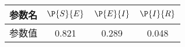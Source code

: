 \begin{tabular}{cccc}
\hline
参数名&$\P{S}{E}$&$\P{E}{I}$&$\P{I}{R}$\\
\hline
参数值&0.821&0.289&0.048\\
\hline
\end{tabular}
